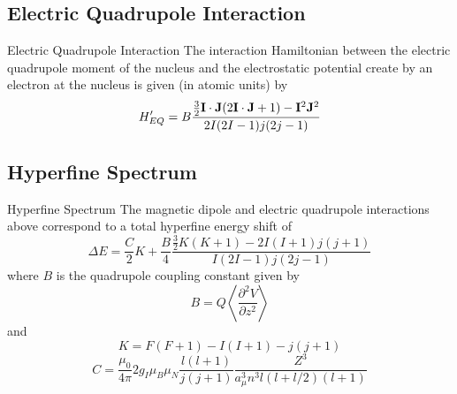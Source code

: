 \documentclass[aspectratio=1610,xcolor=dvipsnames,t]{beamer}
\begin{document}
    \subsection{Electric Quadrupole Interaction}
    \begin{frame}{Electric Quadrupole Interaction} 
    The interaction Hamiltonian between the electric quadrupole moment of the
    nucleus and the electrostatic potential create by an electron at the nucleus is 
    given (in atomic units) by
    \begin{equation}
        H'_{EQ} = B \frac{\frac{3}{2}{\bf I} \cdot {\bf J} (2{\bf I}\cdot {\bf J} + 1) - 
                        {\bf I}^2 {\bf J}^2} {2I(2I-1)j(2j-1)}    
    \end{equation}
    \end{frame} 

    \subsection{Hyperfine Spectrum}
    \begin{frame}{Hyperfine Spectrum} 
    The magnetic dipole and electric quadrupole interactions above correspond to 
    a total hyperfine energy shift of
    \begin{equation}
        \Delta E = \frac{C}{2}K + \frac{B}{4} 
                   \frac{\frac{3}{2}K(K+1)-2I(I+1)j(j+1)}{I(2I-1)j(2j-1)}
    \end{equation}
    where $B$ is the quadrupole coupling constant given by
    \begin{equation}
        B = Q \left \langle \frac{\partial^2 V}{\partial z^2} \right \rangle
    \end{equation}
    and
    \begin{equation}
        K = F(F+1) - I(I+1) - j(j+1)
    \end{equation}
    \begin{equation}
         C = \frac{\mu_0}{4\pi} 2g_I \mu_B \mu_N \frac{l(l+1)}{j(j+1)}
            \frac{Z^3}{a_{\mu}^{3} n^3 l (l + l/2)(l+1)} 
    \end{equation}
    \end{frame} 
\end{document}
